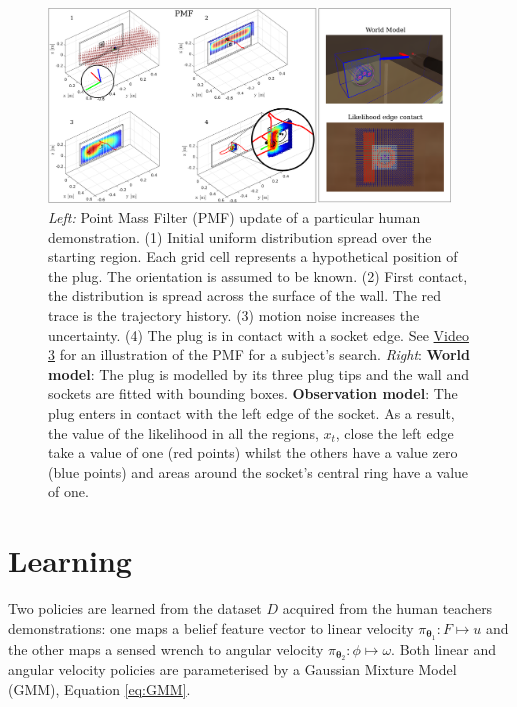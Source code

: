 \documentclass[final,5p,times,twocolumn]{elsarticle}
\newcommand{\Param}{\boldsymbol{\theta}}
\begin{document}
\begin{figure}
 \centering
   \includegraphics[width=0.95\textwidth]{./Figure/Figure2.pdf}
   \caption{\textit{Left:} Point Mass Filter (PMF) update of a particular human demonstration. (1) Initial uniform distribution spread over the starting 
   region. Each grid cell represents a hypothetical position of the plug. The orientation is assumed to be known. (2) First contact, the distribution 
   is spread across the surface of the wall. The red trace is the trajectory history. (3) motion noise increases the uncertainty. (4) The plug is in contact with a socket edge.
   See \href{http://lasa.epfl.ch/videos/gpldecha/pih-search/subject_PMF_belief_location.wmv}{Video 3} for an illustration of the PMF for a subject's search.
   \textit{Right}: \textbf{World model}: The plug is modelled by its three plug tips and the wall and sockets are fitted with bounding boxes.
   \textbf{Observation model}: The plug enters in contact with the left edge of the socket. As a result, the value of the likelihood in all the regions, $x_t$, close the left edge take 
   a value of one (red points)  whilst the others have a value zero (blue points) and areas around the socket's central 
   ring have a value of one. }
  \label{fig:PMF}
\end{figure}




\section{Learning}\label{sec:learning-value-actor}

Two policies are learned from the dataset $D$ acquired from the human teachers demonstrations: 
one maps a belief feature vector to linear velocity $\pi_{\Param_1} : F \mapsto u$ and the other maps a sensed wrench to angular 
velocity $ \pi_{\Param_2} : \phi \mapsto \omega$.  Both linear and angular velocity policies are 
parameterised by a Gaussian Mixture Model (GMM), Equation \ref{eq:GMM}.
\end{document}
